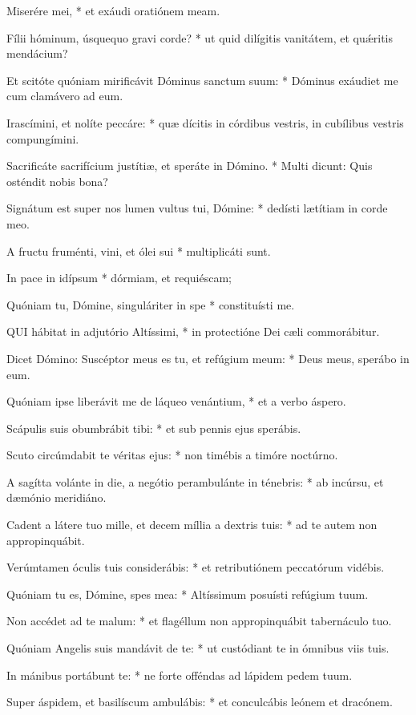 Miserére mei, * et exáudi oratiónem meam.

Fílii hóminum, úsquequo gravi corde? * ut quid dilígitis vanitátem, et quǽritis mendácium?

Et scitóte quóniam mirificávit Dóminus sanctum suum: * Dóminus exáudiet me cum clamávero ad eum.

Irascímini, et nolíte peccáre: * quæ dícitis in córdibus vestris, in cubílibus vestris compungímini.

Sacrificáte sacrifícium justítiæ, et speráte in Dómino. * Multi dicunt: Quis osténdit nobis bona?

Signátum est super nos lumen vultus tui, Dómine: * dedísti lætítiam in corde meo.

A fructu fruménti, vini, et ólei sui * multiplicáti sunt.

In pace in idípsum * dórmiam, et requiéscam;

Quóniam tu, Dómine, singuláriter in spe * constituísti me.


\lettrine[lines=2]{Q}{UI} hábitat in adjutório Altíssimi, * in protectióne Dei cæli commorábitur.

Dicet Dómino: Suscéptor meus es tu, et refúgium meum: * Deus meus, sperábo in eum.

Quóniam ipse liberávit me de láqueo venántium, * et a verbo áspero.

Scápulis suis obumbrábit tibi: * et sub pennis ejus sperábis.

Scuto circúmdabit te véritas ejus: * non timébis a timóre noctúrno.

A sagítta volánte in die, a negótio perambulánte in ténebris: * ab incúrsu, et dæmónio meridiáno.

Cadent a látere tuo mille, et decem míllia a dextris tuis: * ad te autem non appropinquábit.

Verúmtamen óculis tuis considerábis: * et retributiónem peccatórum vidébis.

Quóniam tu es, Dómine, spes mea: * Altíssimum posuísti refúgium tuum.

Non accédet ad te malum: * et flagéllum non appropinquábit tabernáculo tuo.

Quóniam Angelis suis mandávit de te: * ut custódiant te in ómnibus viis tuis.

In mánibus portábunt te: * ne forte offéndas ad lápidem pedem tuum.

Super áspidem, et basilíscum ambulábis: * et conculcábis leónem et dracónem.

